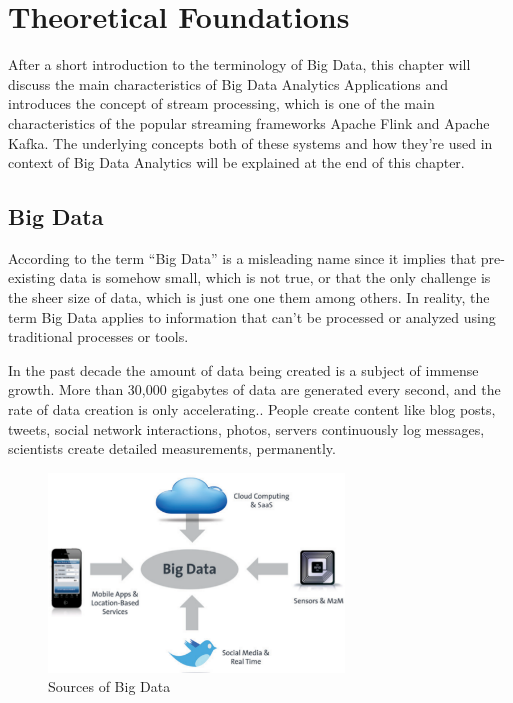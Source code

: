 \chapter{Theoretical Foundations}

After a short introduction to the terminology of Big Data, this chapter will discuss
the main characteristics of Big Data Analytics Applications and introduces the concept of
stream processing, which is one of the main characteristics of the popular streaming
frameworks Apache Flink and Apache Kafka. The underlying concepts both of these systems
and how they're used in context of Big Data Analytics will be explained at the
end of this chapter.

\section{Big Data}

According to \cite{Marz15} the term “Big Data” is a misleading name since it implies that
pre-existing data is somehow small, which is not true, or that the only challenge is the
sheer size of data, which is just one one them among others. In reality, the term Big Data
applies to information that can’t be processed or analyzed using traditional processes or
tools.

In the past decade the amount of data being created is a subject of immense growth.
More than 30,000 gigabytes of data are generated every second, and the rate of data
creation is only accelerating.\cite{Marz15}. People create content like blog posts, tweets, social
network interactions, photos, servers continuously log messages, scientists create detailed
measurements, permanently.

\begin{figure}[H]
	\centering
	\includegraphics[width=0.7\textwidth]{../images/04-sources-of-bigdata.png}
	\caption{Sources of Big Data{\cite{Bitk12}}}
	\label{sources-of-bigdata}
\end{figure}

